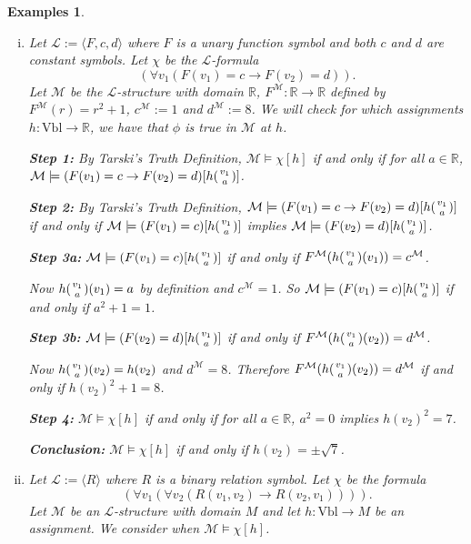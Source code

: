 \documentclass[11pt]{article}
\newcommand{\Vbl}{\textrm{Vbl}}
\newtheorem{examples}[theorem]{Examples}
\newcommand{\mcal}[1]{\mathcal{#1}}
\newcommand{\R}{\mathbb{R}}
\begin{document}
\begin{examples}
\begin{enumerate}[(i)]
\item Let $\mcal{L}:=\langle F,c,d\rangle$ where $F$ is a unary function symbol and both $c$ and $d$ are constant symbols. Let $\chi$ be the $\mcal{L}$-formula
\[(\forall v_1(F(v_1)=c\rightarrow F(v_2)=d)).\]
Let $\mcal{M}$ be the $\mcal{L}$-structure with domain $\R$, $F^{\mcal{M}}:\R\rightarrow \R$ defined by $F^{\mcal{M}}(r)=r^2+1$, $c^{\mcal{M}}:=1$ and $d^{\mcal{M}}:=8$. We will check for which assignments $h:\Vbl\rightarrow \R$, we have that $\phi$ is true in $\mcal{M}$ at $h$.

\medskip

\noindent
\textbf{Step 1:} By Tarski's Truth Definition,
$\mcal{M}\models \chi[h]$ if and only if for all $a\in \R$, $\mcal{M}\models (F(v_1)=c\rightarrow F(v_2)=d)[h({v_1 \atop a})]$.

\medskip

\noindent
\textbf{Step 2:} By Tarski's Truth Definition,
$\mcal{M}\models (F(v_1)=c\rightarrow F(v_2)=d)[h({v_1 \atop a})]$ if and only if $\mcal{M}\models (F(v_1)=c)[h({v_1 \atop a})]$ implies $\mcal{M}\models (F(v_2)=d)[h({v_1 \atop a})]$.

\medskip

\noindent
\textbf{Step 3a:} $\mcal{M}\models (F(v_1)=c)[h({v_1 \atop a})]$ if and only if $F^{\mcal{M}}(h({v_1 \atop a})(v_1))=c^{\mcal{M}}$.

Now $h({v_1 \atop a})(v_1)=a$ by definition and $c^{\mcal{M}}=1$. So $\mcal{M}\models (F(v_1)=c)[h({v_1 \atop a})]$ if and only if $a^2+1=1$.

\medskip

\noindent
\textbf{Step 3b:} $\mcal{M}\models (F(v_2)=d)[h({v_1 \atop a})]$ if and only if $F^{\mcal{M}}(h({v_1 \atop a})(v_2))=d^{\mcal{M}}$.

Now $h({v_1 \atop a})(v_2)=h(v_2)$ and $d^{\mcal{M}}=8$. Therefore $F^{\mcal{M}}(h({v_1 \atop a})(v_2))=d^{\mcal{M}}$ if and only if $h(v_2)^2+1=8$.

\medskip

\noindent
\textbf{Step 4:} $\mcal{M}\models \chi[h]$ if and only if for all $a\in \R$, $a^2=0$ implies $h(v_2)^2=7$.

\medskip

\noindent
\textbf{Conclusion:} $\mcal{M}\models \chi[h]$ if and only if $h(v_2)=\pm \sqrt{7}$.

\item Let $\mcal{L}:=\langle R\rangle$ where $R$ is a binary relation symbol. Let $\chi$ be the formula
\[(\forall v_1 (\forall v_2 (R(v_1,v_2)\rightarrow R(v_2,v_1)))).\] Let $\mcal{M}$ be an $\mcal{L}$-structure with domain $M$ and let $h:\Vbl\rightarrow M$ be an assignment. We consider when $\mcal{M}\models \chi[h]$.


\end{enumerate}
\end{examples}
\end{document}
